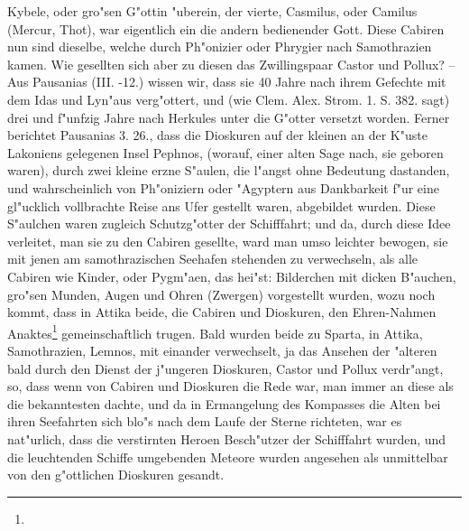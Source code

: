 \documentclass[a4paper, 11pt, oneside, polutonikogreek, german]{article}
\begin{document}
Kybele, oder gro"sen G"ottin "uberein, der vierte, Casmilus, oder Camilus (Mercur, Thot), war eigentlich ein die andern bedienender Gott. Diese Cabiren nun sind dieselbe, welche durch Ph"onizier oder Phrygier nach Samothrazien kamen. Wie gesellten sich aber zu diesen das Zwillingspaar Castor und Pollux? -- Aus Pausanias (III. -12.) wissen wir, dass sie 40 Jahre nach ihrem Gefechte mit dem Idas und Lyn"aus verg"ottert, und (wie Clem. Alex. Strom. 1. S. 382. sagt) drei und f"unfzig Jahre nach Herkules unter die G"otter versetzt worden. Ferner berichtet Pausanias 3. 26., dass die Dioskuren auf der kleinen an der K"uste Lakoniens gelegenen Insel Pephnos, (worauf, einer alten Sage nach, sie geboren waren), durch zwei kleine erzne S"aulen, die l"angst ohne Bedeutung dastanden, und wahrscheinlich von Ph"oniziern oder "Agyptern aus Dankbarkeit f"ur eine gl"ucklich vollbrachte Reise ans Ufer gestellt waren, abgebildet wurden. Diese S"aulchen waren zugleich Schutzg"otter der Schifffahrt; und da, durch diese Idee verleitet, man sie zu den Cabiren gesellte, ward man umso leichter bewogen, sie mit jenen am samothrazischen Seehafen stehenden zu verwechseln, als alle Cabiren wie Kinder, oder Pygm"aen, das hei"st: Bilderchen mit dicken B"auchen, gro"sen Munden, Augen und Ohren (Zwergen) vorgestellt wurden, wozu noch kommt, dass in Attika beide, die Cabiren und Dioskuren, den Ehren-Nahmen Anaktes\footnote{} gemeinschaftlich trugen. Bald wurden beide zu Sparta, in Attika, Samothrazien, Lemnos, mit einander verwechselt, ja das Ansehen der "alteren bald durch den Dienst der j"ungeren Dioskuren, Castor und Pollux verdr"angt, so, dass wenn von Cabiren und Dioskuren die Rede war, man immer an diese als die bekanntesten dachte, und da in Ermangelung des Kompasses die Alten bei ihren Seefahrten sich blo"s nach dem Laufe der Sterne richteten, war es nat"urlich, dass die verstirnten Heroen Besch"utzer der Schifffahrt wurden, und die leuchtenden Schiffe umgebenden Meteore wurden angesehen als unmittelbar von den g"ottlichen Dioskuren gesandt.
\end{document}
